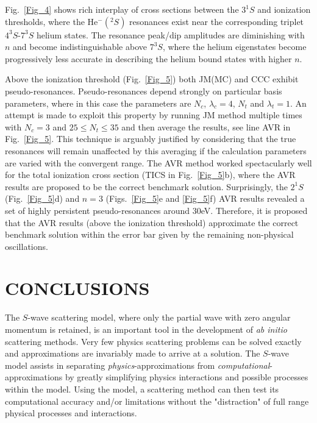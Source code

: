 \documentclass[aip
, pra
, showpacs
, aps
, twocolumn
, groupedaddress
, floatfix
]{revtex4}
\begin{document}
Fig.~\ref{Fig_4} shows  rich interplay of cross sections between the $3^1S$ and ionization thresholds,
where the He$^-(^2S)$ resonances exist near the corresponding triplet $4^3S$-$7^3S$ helium states.
The resonance peak/dip amplitudes are diminishing with $n$ and become indistinguishable above $7^3S$,
where the helium eigenstates become progressively less accurate in describing the helium bound states with higher $n$.


Above the ionization threshold (Fig.~\ref{Fig_5}) both JM(MC) and CCC exhibit pseudo-resonances.
Pseudo-resonances depend strongly on particular basis parameters, where in this case the parameters are $N_c$, $\lambda_c=4$, $N_t$ and $\lambda_t=1$.
An attempt is made to exploit this property by running JM method multiple times with $N_c=3$ and $25 \leq N_t\leq 35$ and then average the results, see line AVR in Fig.~\ref{Fig_5}.
This technique is arguably justified by considering that the true resonances will remain unaffected by this averaging if the calculation parameters are varied with the convergent range.
The AVR method worked spectacularly well for the total ionization cross section (TICS in Fig.~\ref{Fig_5}b), where the AVR results are proposed to be the correct benchmark solution.
Surprisingly, the $2^1S$ (Fig.~\ref{Fig_5}d) and $n=3$ (Figs.~\ref{Fig_5}e and \ref{Fig_5}f) AVR results revealed a set of highly persistent pseudo-resonances around 30eV.
Therefore, it is proposed that the AVR results (above the ionization threshold) approximate the correct benchmark solution within the error bar given by the remaining non-physical oscillations.

\section{CONCLUSIONS}


The $S$-wave scattering model, where only the partial wave with zero angular momentum is retained,
is an important tool in the development of {\em ab initio} scattering methods.
Very few physics scattering problems can be solved exactly and approximations are invariably made to arrive at a solution.
The $S$-wave model assists in separating {\em physics}-approximations from {\em computational}-approximations by
greatly simplifying physics interactions and possible processes within the model.
Using the model, a scattering method can then test its computational accuracy
and/or limitations without the "distraction" of full range physical processes and interactions.
\end{document}
